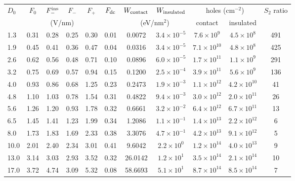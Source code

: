 \begin{tabular}{lcccccccccc}
\hline\hline
$D_0$ & $F_0$ & $F_-^{\rm ins}$ & $F_-$ & $F_+$ & $F_{\rm dc}$ & $W_{\rm contact}$ & $W_{\rm insulated}$ & \multicolumn{2}{c}{holes (cm$^{-2}$)} & $S_2$ ratio \\
\multicolumn{6}{c}{(V/nm)} & \multicolumn{2}{c}{(eV/nm$^2$)} & contact & insulated & \\
\hline
1.3 & 0.31 & 0.28 & 0.25 & 0.30 & 0.01 & 0.0072 & $3.4\times10^{-5}$ & $7.6\times10^{9}$ & $4.5\times10^{8}$ & 491 \\
1.9 & 0.45 & 0.41 & 0.36 & 0.47 & 0.04 & 0.0316 & $3.4\times10^{-5}$ & $7.1\times10^{10}$ & $4.8\times10^{8}$ & 425 \\
2.6 & 0.62 & 0.56 & 0.48 & 0.71 & 0.10 & 0.0896 & $6.0\times10^{-5}$ & $1.7\times10^{11}$ & $1.1\times10^{9}$ & 291 \\
3.2 & 0.75 & 0.69 & 0.57 & 0.94 & 0.15 & 0.1200 & $2.5\times10^{-4}$ & $3.9\times10^{11}$ & $5.6\times10^{9}$ & 136 \\
4.0 & 0.93 & 0.86 & 0.68 & 1.25 & 0.23 & 0.2473 & $1.9\times10^{-3}$ & $1.1\times10^{12}$ & $4.2\times10^{10}$ & 41 \\
4.8 & 1.10 & 1.03 & 0.78 & 1.54 & 0.31 & 0.4822 & $9.4\times10^{-3}$ & $3.0\times10^{12}$ & $2.0\times10^{11}$ & 26 \\
5.6 & 1.26 & 1.20 & 0.93 & 1.78 & 0.32 & 0.6661 & $3.2\times10^{-2}$ & $6.4\times10^{12}$ & $6.7\times10^{11}$ & 13 \\
6.5 & 1.45 & 1.41 & 1.23 & 1.99 & 0.34 & 1.2086 & $1.1\times10^{-1}$ & $1.4\times10^{13}$ & $2.2\times10^{12}$ & 6 \\
8.0 & 1.73 & 1.83 & 1.69 & 2.33 & 0.38 & 3.3076 & $4.7\times10^{-1}$ & $4.2\times10^{13}$ & $9.1\times10^{12}$ & 5 \\
10.0 & 2.01 & 2.40 & 2.34 & 3.01 & 0.41 & 9.6042 & $2.2\times10^{0}$ & $1.2\times10^{14}$ & $4.0\times10^{13}$ & 9 \\
13.0 & 3.14 & 3.03 & 2.93 & 3.52 & 0.32 & 26.0142 & $1.2\times10^{1}$ & $3.5\times10^{14}$ & $2.1\times10^{14}$ & 10 \\
17.0 & 3.72 & 4.74 & 3.09 & 5.32 & 0.08 & 58.6693 & $5.1\times10^{1}$ & $8.7\times10^{14}$ & $8.5\times10^{14}$ & 7 \\
\hline\hline
\end{tabular}
